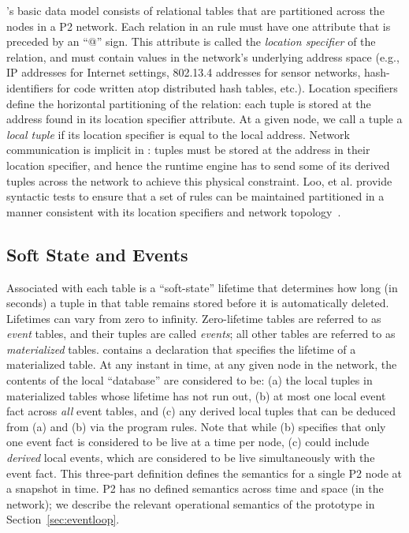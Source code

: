 \OVERLOG's basic data model consists of relational tables that are partitioned 
across the nodes in a P2 network. Each relation in an \OVERLOG rule must have 
one attribute that is preceded by an ``@'' sign.  This attribute is called the 
{\em location specifier} of the relation, and must contain values in the network's
underlying address space (e.g., IP addresses for Internet settings,
802.13.4 addresses for sensor networks, hash-identifiers for code
written atop distributed hash tables, etc.).  Location specifiers define
the horizontal partitioning of the relation: each tuple is stored at the
address found in its location specifier attribute.  At a given node, we
call a tuple a {\em local tuple} if its location specifier is equal to
the local address.  Network communication is implicit in \OVERLOG: tuples
must be stored at the address in their location specifier, and hence the
runtime engine has to send some of its derived tuples across the network
to achieve this physical constraint.  Loo, et al. provide syntactic tests to
ensure that a set of rules can be maintained partitioned in a manner
consistent with its location specifiers and network
topology~\cite{loo-sigmod06}.


\subsection{Soft State and Events}

Associated with each \OVERLOG table is a ``soft-state'' lifetime that determines 
how long (in seconds) a tuple in that table remains stored before it is automatically 
deleted.  Lifetimes can vary from zero to infinity.  Zero-lifetime tables are referred to as
{\em event} tables, and their tuples are called \emph{events}; all other
tables are referred to as {\em materialized} tables.  \OVERLOG contains a
 declaration that specifies the lifetime of a
materialized table.  At any instant in time, at any given node in the
network, the contents of the local \OVERLOG ``database'' are considered
to be: (a) the local tuples in materialized tables whose lifetime has
not run out, (b) at most one local event fact across {\em all} event
tables, and (c) any derived local tuples that can be deduced from (a)
and (b) via the program rules.  Note that while (b) specifies that only
one event fact is considered to be live at a time per node, (c) could
include {\em derived} local events, which are considered to be live
simultaneously with the event fact.  This three-part definition defines the semantics for a
single P2 node at a snapshot in time.  P2 has no defined semantics
across time and space (in the network); we describe the relevant operational
semantics of the prototype in Section~\ref{sec:eventloop}.
     

